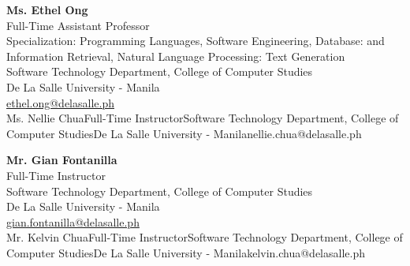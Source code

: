 %
%
%                 
\label{sec:appendixc}

%
%
%
%
%
\newcommand{\resperson}[6]{\textbf{#1} \\ #2 \\ #3 \\ #4 \\ \url{#5}\vspace{0.5em}\\}

\resperson{Ms. Ethel Ong}{Full-Time Assistant Professor}{Specialization: Programming Languages, Software Engineering, Database: and Information Retrieval, Natural Language Processing: Text Generation\\Software Technology Department, College of Computer Studies}{De La Salle University - Manila}{ethel.ong@delasalle.ph}

\resperson{Ms. Nellie Chua}{Full-Time Instructor}{Software Technology Department, College of Computer Studies}{De La Salle University - Manila}{nellie.chua@delasalle.ph}

\resperson{Mr. Gian Fontanilla}{Full-Time Instructor}{Software Technology Department, College of Computer Studies}{De La Salle University - Manila}{gian.fontanilla@delasalle.ph}

\resperson{Mr. Kelvin Chua}{Full-Time Instructor}{Software Technology Department, College of Computer Studies}{De La Salle University - Manila}{kelvin.chua@delasalle.ph}

